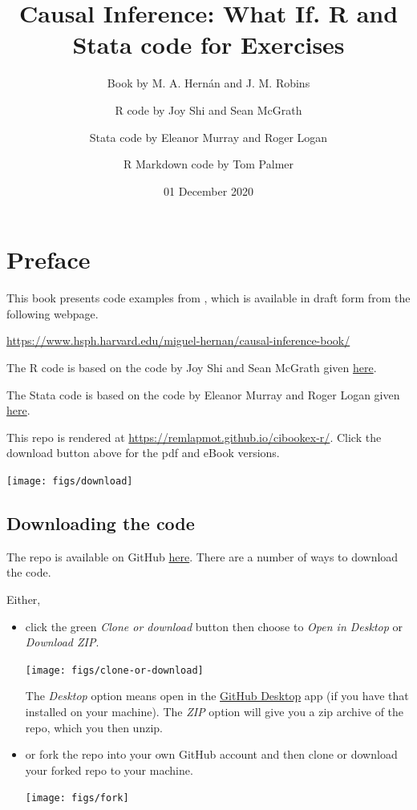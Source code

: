 \documentclass[
  10pt,
]{book}
\title{Causal Inference: What If. R and Stata code for Exercises}
\author{Book by M. A. Hernán and J. M. Robins \and R code by Joy Shi and Sean McGrath \and Stata code by Eleanor Murray and Roger Logan \and R Markdown code by Tom Palmer}
\date{01 December 2020}
\begin{document}
\maketitle

\thispagestyle{empty}

{
\setcounter{tocdepth}{1}
\tableofcontents
}
\hypertarget{preface}{%
\chapter*{Preface}\label{preface}}

This book presents code examples from \citet{ci-book}, which is available in draft form from the following webpage.

\url{https://www.hsph.harvard.edu/miguel-hernan/causal-inference-book/}

The R code is based on the code by Joy Shi and Sean McGrath given \href{https://cdn1.sph.harvard.edu/wp-content/uploads/sites/1268/1268/20/Rcode_CIpart2.zip}{here}.

The Stata code is based on the code by Eleanor Murray and Roger Logan given \href{https://cdn1.sph.harvard.edu/wp-content/uploads/sites/1268/2019/11/stata_part2.zip}{here}.

This repo is rendered at \url{https://remlapmot.github.io/cibookex-r/}. Click the download button above for the pdf and eBook versions.

\begin{center}\texttt{[image: figs/download]} \end{center}

\hypertarget{downloading-the-code}{%
\section{Downloading the code}\label{downloading-the-code}}

The repo is available on GitHub \href{https://github.com/remlapmot/cibookex-r}{here}. There are a number of ways to download the code.

Either,

\begin{itemize}
\item
  click the green \emph{Clone or download} button then choose to \emph{Open in Desktop} or \emph{Download ZIP}.

  \begin{center}\texttt{[image: figs/clone-or-download]} \end{center}

  The \emph{Desktop} option means open in the \href{https://desktop.github.com/}{GitHub Desktop} app (if you have that installed on your machine). The \emph{ZIP} option will give you a zip archive of the repo, which you then unzip.
\item
  or fork the repo into your own GitHub account and then clone or download your forked repo to your machine.

  \begin{center}\texttt{[image: figs/fork]} \end{center}
\end{itemize}
\end{document}
